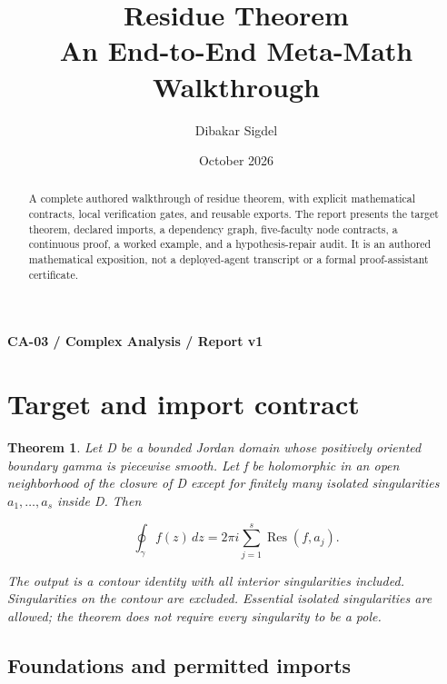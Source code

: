 \documentclass[preprint,12pt,aps,pra,showkeys,amsmath,amssymb,superscriptaddress,floatfix]{revtex4-2}
\newtheorem{theorem}{Theorem}[section]
\theoremstyle{definition}
\theoremstyle{remark}
\begin{document}
\title{Residue Theorem\\[4pt]\large An End-to-End Meta-Math Walkthrough}

\author{Dibakar Sigdel}


\date{October 2026}

\begin{abstract}

A complete authored walkthrough of residue theorem, with explicit
mathematical contracts, local verification gates, and reusable exports.
The report presents the target theorem, declared imports, a dependency
graph, five-faculty node contracts, a continuous proof, a worked
example, and a hypothesis-repair audit. It is an authored mathematical
exposition, not a deployed-agent transcript or a formal proof-assistant
certificate.

\end{abstract}\maketitle\linespread{1.12}\selectfont

\noindent\textbf{CA-03 / Complex Analysis / Report v1}

\section{Target and import contract}

\begin{theorem}

Let D be a bounded Jordan domain whose positively oriented boundary
gamma is piecewise smooth. Let f be holomorphic in an open neighborhood
of the closure of D except for finitely many isolated singularities
\(a_1,\ldots,a_s\) inside D. Then

\[\oint_\gamma f(z)\,dz=2\pi i\sum_{j=1}^s\operatorname{Res}(f,a_j).\]

The output is a contour identity with all interior singularities
included. Singularities on the contour are excluded. Essential isolated
singularities are allowed; the theorem does not require every
singularity to be a pole.

\end{theorem}

\subsection{Foundations and permitted imports}
\end{document}
